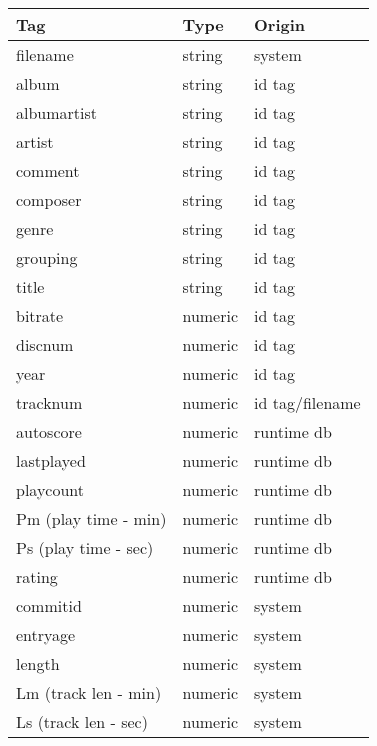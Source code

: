 %
\begin{table}
\begin{center}
  \begin{tabularx}{.75\textwidth}{XX}%
  \toprule%
  \textbf{Tag}   & \textbf{Type}  & \textbf{Origin} \\
  \midrule
  filename              & string    & system \\ 
  album                 & string    & id tag \\
  albumartist           & string    & id tag \\
  artist                & string    & id tag \\
  comment               & string    & id tag \\
  composer              & string    & id tag \\
  genre                 & string    & id tag \\
  grouping              & string    & id tag \\
  title                 & string    & id tag \\
  bitrate               & numeric   & id tag \\
  discnum               & numeric   & id tag \\
  year                  & numeric   & id tag \\
  tracknum              & numeric   & id tag/filename \\
  autoscore             & numeric   & runtime db \\
  lastplayed            & numeric   & runtime db \\
  playcount             & numeric   & runtime db \\
  Pm (play time - min)  & numeric   & runtime db \\
  Ps (play time - sec)  & numeric   & runtime db \\
  rating                & numeric   & runtime db \\
  commitid              & numeric   & system \\
  entryage              & numeric   & system \\
  length                & numeric   & system \\
  Lm (track len - min)  & numeric   & system \\
  Ls (track len - sec)  & numeric   & system \\
  \bottomrule
  \end{tabularx}
\end{center}
\end{table}
